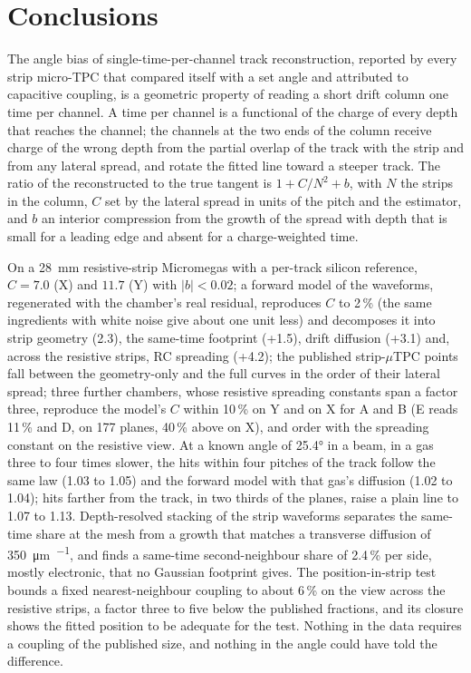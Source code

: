 \section{Conclusions}\label{sec:conclusions}

The angle bias of single-time-per-channel track reconstruction, reported by every strip micro-TPC that compared itself with
a set angle and attributed to capacitive coupling, is a geometric property of reading a short drift column one time per
channel. A time per channel is a functional of the charge of every depth that reaches the channel; the channels at the two
ends of the column receive charge of the wrong depth from the partial overlap of the track with the strip and from any
lateral spread, and rotate the fitted line toward a steeper track. The ratio of the reconstructed to the true tangent is
$1 + C/N^2 + b$, with $N$ the strips in the column, $C$ set by the lateral spread in units of the pitch and the estimator, and
$b$ an interior compression from the growth of the spread with depth that is small for a leading edge and absent for a
charge-weighted time.

On a 28~mm resistive-strip Micromegas with a per-track silicon reference, $C = 7.0$ (X) and $11.7$ (Y) with $|b| < 0.02$; a
forward model of the waveforms, regenerated with the chamber's real residual, reproduces $C$ to 2\,\% (the same ingredients with
white noise give about one unit less) and decomposes it into strip geometry (2.3), the same-time footprint (+1.5), drift
diffusion (+3.1) and, across the resistive strips, RC spreading (+4.2); the published strip-$\mu$TPC points fall
between the geometry-only and the full curves in the order of their lateral spread; three further chambers, whose resistive
spreading constants span a factor three, reproduce the model's $C$ within 10\,\% on Y and on X for A and B (E reads 11\,\% and D, on 177 planes, 40\,\% above on X), and
order with the spreading constant on the resistive view. At a known angle of \ang{25.4} in a beam, in a gas three to four
times slower, the hits within four pitches of the track follow the same law (1.03 to 1.05) and the forward model
with that gas's diffusion (1.02 to 1.04); hits farther from the track, in two thirds of the planes, raise a plain line to 1.07 to 1.13. Depth-resolved stacking of the strip
waveforms separates the same-time share at the mesh from a growth that matches a transverse diffusion of
\SI{350}{\micro\metre\per{}}, and finds a same-time second-neighbour share of 2.4\,\% per side, mostly electronic, that no
Gaussian footprint gives. The position-in-strip test bounds a fixed nearest-neighbour coupling to about 6\,\% on the view
across the resistive strips, a factor three to five below the published fractions, and its closure shows the fitted position
to be adequate for the test. Nothing in the data requires a coupling of the published size, and nothing in the angle could
have told the difference.

